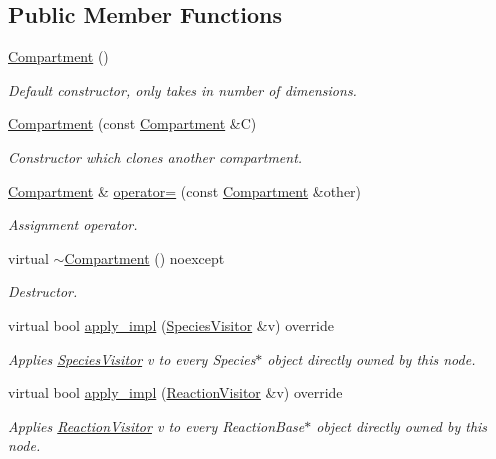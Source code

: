 \subsection*{Public Member Functions}
\begin{DoxyCompactItemize}
\item 
\hyperlink{classCompartment_a582e5f8a00d5a30f07f7f653637d7aef}{Compartment} ()
\begin{DoxyCompactList}\small\item\em Default constructor, only takes in number of dimensions. \end{DoxyCompactList}\item 
\hyperlink{classCompartment_a82f6252038138287faebd6e9a781a2f3}{Compartment} (const \hyperlink{classCompartment}{Compartment} \&C)
\begin{DoxyCompactList}\small\item\em Constructor which clones another compartment. \end{DoxyCompactList}\item 
\hyperlink{classCompartment}{Compartment} \& \hyperlink{classCompartment_a2a740ffd02de79301b5d79e7f2fde461}{operator=} (const \hyperlink{classCompartment}{Compartment} \&other)
\begin{DoxyCompactList}\small\item\em Assignment operator. \end{DoxyCompactList}\item 
virtual \hyperlink{classCompartment_ae464fb54124c6a47eeeb49609a5ae5aa}{$\sim$\+Compartment} () noexcept
\begin{DoxyCompactList}\small\item\em Destructor. \end{DoxyCompactList}\item 
virtual bool \hyperlink{classCompartment_ae9bdaf50db8e780d3614be3bc50e9171}{apply\+\_\+impl} (\hyperlink{classSpeciesVisitor}{Species\+Visitor} \&v) override
\begin{DoxyCompactList}\small\item\em Applies \hyperlink{classSpeciesVisitor}{Species\+Visitor} v to every Species$\ast$ object directly owned by this node. \end{DoxyCompactList}\item 
virtual bool \hyperlink{classCompartment_a37bd8d3a6d3a21bf50716979c6694adb}{apply\+\_\+impl} (\hyperlink{classReactionVisitor}{Reaction\+Visitor} \&v) override
\begin{DoxyCompactList}\small\item\em Applies \hyperlink{classReactionVisitor}{Reaction\+Visitor} v to every Reaction\+Base$\ast$ object directly owned by this node. \end{DoxyCompactList}\item 

\end{DoxyCompactItemize}
